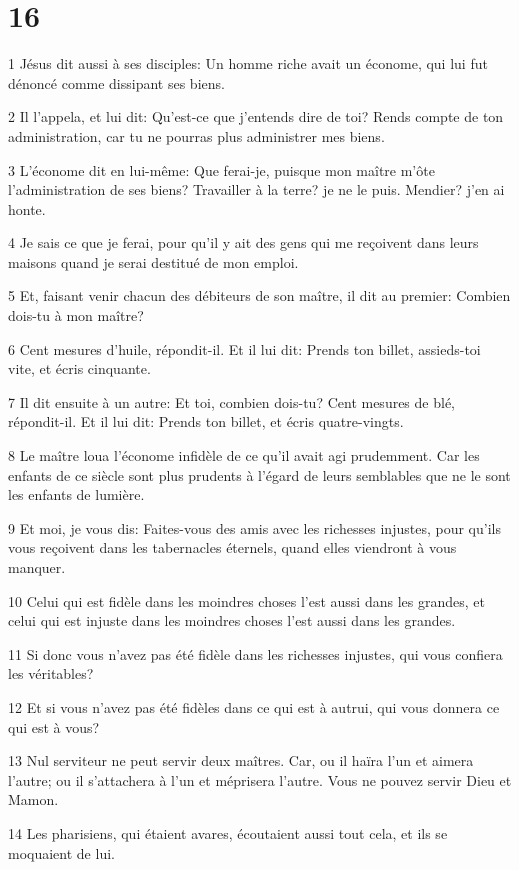 \chapter{16}

\par 1 Jésus dit aussi à ses disciples: Un homme riche avait un économe, qui lui fut dénoncé comme dissipant ses biens.
\par 2 Il l'appela, et lui dit: Qu'est-ce que j'entends dire de toi? Rends compte de ton administration, car tu ne pourras plus administrer mes biens.
\par 3 L'économe dit en lui-même: Que ferai-je, puisque mon maître m'ôte l'administration de ses biens? Travailler à la terre? je ne le puis. Mendier? j'en ai honte.
\par 4 Je sais ce que je ferai, pour qu'il y ait des gens qui me reçoivent dans leurs maisons quand je serai destitué de mon emploi.
\par 5 Et, faisant venir chacun des débiteurs de son maître, il dit au premier: Combien dois-tu à mon maître?
\par 6 Cent mesures d'huile, répondit-il. Et il lui dit: Prends ton billet, assieds-toi vite, et écris cinquante.
\par 7 Il dit ensuite à un autre: Et toi, combien dois-tu? Cent mesures de blé, répondit-il. Et il lui dit: Prends ton billet, et écris quatre-vingts.
\par 8 Le maître loua l'économe infidèle de ce qu'il avait agi prudemment. Car les enfants de ce siècle sont plus prudents à l'égard de leurs semblables que ne le sont les enfants de lumière.
\par 9 Et moi, je vous dis: Faites-vous des amis avec les richesses injustes, pour qu'ils vous reçoivent dans les tabernacles éternels, quand elles viendront à vous manquer.
\par 10 Celui qui est fidèle dans les moindres choses l'est aussi dans les grandes, et celui qui est injuste dans les moindres choses l'est aussi dans les grandes.
\par 11 Si donc vous n'avez pas été fidèle dans les richesses injustes, qui vous confiera les véritables?
\par 12 Et si vous n'avez pas été fidèles dans ce qui est à autrui, qui vous donnera ce qui est à vous?
\par 13 Nul serviteur ne peut servir deux maîtres. Car, ou il haïra l'un et aimera l'autre; ou il s'attachera à l'un et méprisera l'autre. Vous ne pouvez servir Dieu et Mamon.
\par 14 Les pharisiens, qui étaient avares, écoutaient aussi tout cela, et ils se moquaient de lui.
